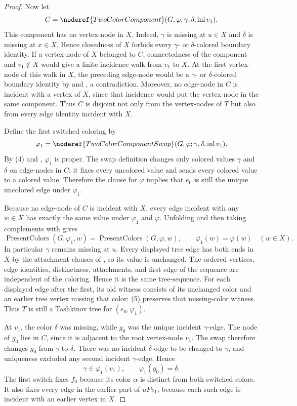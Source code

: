 \begin{proof}
Now let
\[
 C=\noderef{TwoColorComponent}(G,\varphi;\gamma,\delta,
       \operatorname{inl}v_1).
\]
This component has no vertex-node in $X$.  Indeed, $\gamma$ is missing at
$u\in X$ and $\delta$ is missing at $x\in X$.  Hence closedness of $X$
forbids every $\gamma$- or $\delta$-colored boundary identity.  If a
vertex-node of $X$ belonged to $C$, connectedness of the component and
$v_1\notin X$ would give a finite incidence walk from $v_1$ to $X$.
At the first vertex-node of this walk in $X$, the preceding edge-node
would be a $\gamma$- or $\delta$-colored boundary identity by
 and , a
contradiction.  Moreover, no edge-node in $C$ is incident with a vertex
of $X$, since that incidence would put the vertex-node in the same
component.  Thus $C$ is disjoint not only from the vertex-nodes of $T$ but
also from every edge identity incident with $X$.

Define the first switched coloring by
\[
 \varphi_1=\noderef{TwoColorComponentSwap}
   (G,\varphi;\gamma,\delta,\operatorname{inl}v_1).
\]
By (4) and , $\varphi_1$ is proper.
The swap definition changes only colored values $\gamma$ and $\delta$ on
edge-nodes in $C$; it fixes every uncolored value and sends every colored
value to a colored value.  Therefore the
 clause for $\varphi$ implies that
$e_0$ is still the unique uncolored edge under $\varphi_1$.

Because no edge-node of $C$ is incident with $X$, every edge incident
with any $w\in X$ has exactly the same value under $\varphi_1$ and
$\varphi$.  Unfolding  and then taking complements
with  gives
\[
 \operatorname{PresentColors}(G,\varphi_1,w)
   =\operatorname{PresentColors}(G,\varphi,w),
 \qquad
 \overline{\varphi_1}(w)=\overline\varphi(w)
 \quad(w\in X). \tag{5}
\]
In particular $\gamma$ remains missing at $u$.  Every displayed tree edge
has both ends in $X$ by the attachment clauses of
, so its value is unchanged.  The ordered vertices,
edge identities, distinctness, attachments, and first edge of the
sequence are independent of the coloring.  Hence it is the same
tree-sequence.  For each displayed edge after the first, its old
 witness consists of its unchanged color and an
earlier tree vertex missing that color; (5) preserves that missing-color
witness.  Thus $T$ is still a Tashkinov tree for
$(e_0,\varphi_1)$.

At $v_1$, the color $\delta$ was missing, while $g_0$ was the unique
incident $\gamma$-edge.  The node of $g_0$ lies in $C$, since it is
adjacent to the root vertex-node $v_1$.  The swap therefore changes
$g_0$ from $\gamma$ to $\delta$.  There was no incident
$\delta$-edge to be changed to $\gamma$, and uniqueness excluded any
second incident $\gamma$-edge.  Hence
\[
 \gamma\in\overline{\varphi_1}(v_1),
 \qquad \varphi_1(g_0)=\delta. \tag{6}
\]
The first switch fixes $f_0$ because its color $\alpha$ is distinct from
both switched colors.  It also fixes every edge in the earlier part of
$uPv_1$, because each such edge is incident with an earlier vertex in
$X$.


\end{proof}
